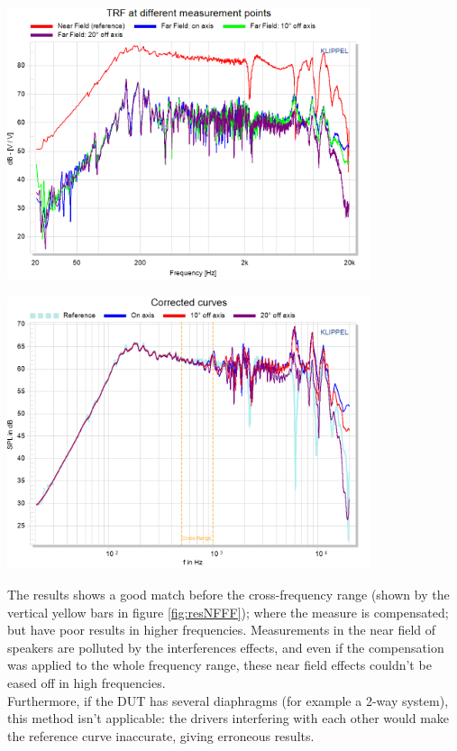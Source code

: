 \documentclass{report}
\begin{document}
\vspace{0.4cm}

\begin{minipage}{0.5\textwidth}
\begin{center}
	\includegraphics[width=0.8\textwidth]{RoomComp/NF_FF_compa} 
    \captionsetup{hypcap=false} 
	\label{fig:rawNFFF}
\end{center}
\end{minipage}
\begin{minipage}{0.5\textwidth}
\begin{center}
	\includegraphics[width=0.8\textwidth]{RoomComp/NF_FF_result} 
    \captionsetup{hypcap=false} 
	\label{fig:resNFFF}
\end{center}
\end{minipage}
\vspace{0.2cm}

The results shows a good match before the cross-frequency range (shown by the vertical yellow bars in figure \ref{fig:resNFFF}); where the measure is compensated; but have poor results in higher frequencies. Measurements in the near field of speakers are polluted by the interferences effects, and even if the compensation was applied to the whole frequency range, these near field effects couldn't be eased off in high frequencies.\\
Furthermore, if the DUT has several diaphragms (for example a 2-way system), this method isn't applicable: the drivers interfering with each other would make the reference curve inaccurate, giving erroneous results. 
\end{document}
